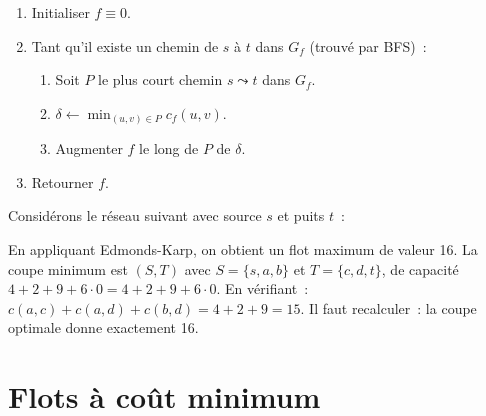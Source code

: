 \begin{algorithme}[title=\textbf{Edmonds-Karp}]
\begin{enumerate}
  \item Initialiser $f \equiv 0$.
  \item Tant qu'il existe un chemin de $s$ \`a $t$ dans $G_f$ (trouv\'e par BFS)~:
    \begin{enumerate}
      \item Soit $P$ le plus court chemin $s \leadsto t$ dans $G_f$.
      \item $\delta \leftarrow \min_{(u,v) \in P} c_f(u,v)$.
      \item Augmenter $f$ le long de $P$ de $\delta$.
    \end{enumerate}
  \item Retourner $f$.
\end{enumerate}
\end{algorithme}

\begin{exemple}
Consid\'erons le r\'eseau suivant avec source $s$ et puits $t$~:
\begin{center}
\end{center}

En appliquant Edmonds-Karp, on obtient un flot maximum de valeur 16. La coupe
minimum est $(S, T)$ avec $S = \{s, a, b\}$ et $T = \{c, d, t\}$, de
capacit\'e $4 + 2 + 9 + 6 \cdot 0 = 4 + 2 + 9 + 6\cdot 0$. En v\'erifiant~:
$c(a,c) + c(a,d) + c(b,d) = 4 + 2 + 9 = 15$. Il faut recalculer~: la coupe
optimale donne exactement 16.
\end{exemple}

\section{Flots \`a co\^ut minimum}

